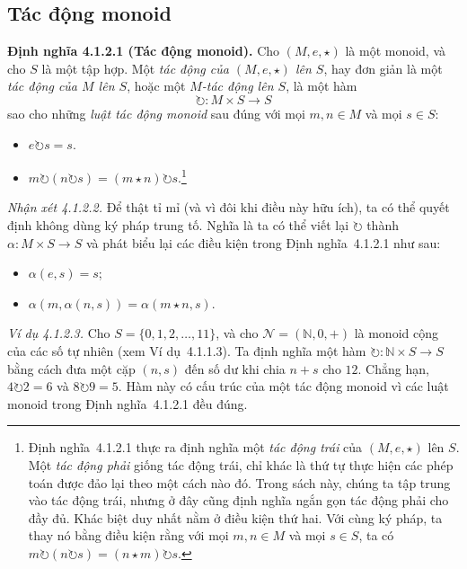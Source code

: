 \subsection{Tác động monoid}

\noindent\textbf{Định nghĩa 4.1.2.1 (Tác động monoid).} Cho $(M,e,\star)$ là một monoid, và cho $S$ là một tập hợp. Một \emph{tác động của $(M,e,\star)$ lên $S$}, hay đơn giản là một \emph{tác động của $M$ lên $S$}, hoặc một \emph{$M$-tác động lên $S$}, là một hàm
\[
\circlearrowright:M\times S\to S
\]
sao cho những \emph{luật tác động monoid} sau đúng với mọi $m,n\in M$ và mọi $s\in S$:
\begin{itemize}
\item $e\circlearrowright s=s$.
\item $m\circlearrowright(n\circlearrowright s)=(m\star n)\circlearrowright s$.\footnote{Định nghĩa~4.1.2.1 thực ra định nghĩa một \emph{tác động trái} của $(M,e,\star)$ lên $S$. Một \emph{tác động phải} giống tác động trái, chỉ khác là thứ tự thực hiện các phép toán được đảo lại theo một cách nào đó. Trong sách này, chúng ta tập trung vào tác động trái, nhưng ở đây cũng định nghĩa ngắn gọn tác động phải cho đầy đủ. Khác biệt duy nhất nằm ở điều kiện thứ hai. Với cùng ký pháp, ta thay nó bằng điều kiện rằng với mọi $m,n\in M$ và mọi $s\in S$, ta có $m\circlearrowright(n\circlearrowright s)=(n\star m)\circlearrowright s$.}
\end{itemize}

\noindent\textit{Nhận xét 4.1.2.2.} Để thật tỉ mỉ (và vì đôi khi điều này hữu ích), ta có thể quyết định không dùng ký pháp trung tố. Nghĩa là ta có thể viết lại $\circlearrowright$ thành $\alpha:M\times S\to S$ và phát biểu lại các điều kiện trong Định nghĩa~4.1.2.1 như sau:
\begin{itemize}
\item $\alpha(e,s)=s$;
\item $\alpha(m,\alpha(n,s))=\alpha(m\star n,s)$.
\end{itemize}

\noindent\textit{Ví dụ 4.1.2.3.} Cho $S=\{0,1,2,\ldots,11\}$, và cho $\mathcal{N}=(\mathbb{N},0,+)$ là monoid cộng của các số tự nhiên (xem Ví dụ~4.1.1.3). Ta định nghĩa một hàm $\circlearrowright:\mathbb{N}\times S\to S$ bằng cách đưa một cặp $(n,s)$ đến số dư khi chia $n+s$ cho $12$. Chẳng hạn, $4\circlearrowright2=6$ và $8\circlearrowright9=5$. Hàm này có cấu trúc của một tác động monoid vì các luật monoid trong Định nghĩa~4.1.2.1 đều đúng.

